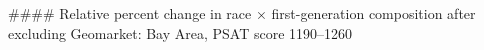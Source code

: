 #### Relative percent change in race × first-generation composition after excluding Geomarket: Bay Area, PSAT score 1190–1260
